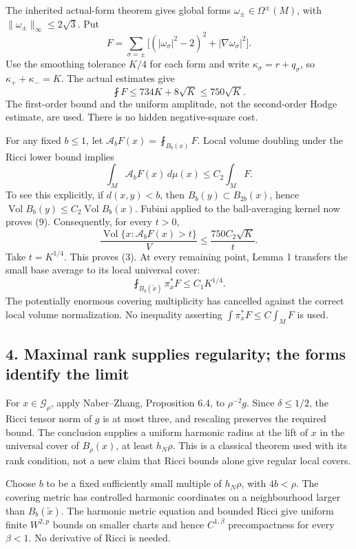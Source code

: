 \documentclass[
  11pt,
]{article}
\begin{document}
The inherited actual-form theorem gives global forms
\(\omega_\pm\in\Omega^\pm(M)\), with
\(\|\omega_\pm\|_\infty\le2\sqrt3\). Put \[
 F=\sum_{\sigma=\pm}
     \bigl[(|\omega_\sigma|^2-2)^2+|\nabla\omega_\sigma|^2\bigr].
 \tag{7}
\] Use the smoothing tolerance \(K/4\) for each form and write
\(\kappa_\sigma=r+q_\sigma\), so \(\kappa_++\kappa_-=K\). The actual
estimates give \[
 \fint F\le734K+8\sqrt K\le750\sqrt K.
 \tag{8}
\] The first-order bound and the uniform amplitude, not the second-order
Hodge estimate, are used. There is no hidden negative-square cost.

For any fixed \(b\le1\), let \(\mathcal A_bF(x)=\fint_{B_b(x)}F\). Local
volume doubling under the Ricci lower bound implies \[
 \int_M\mathcal A_bF(x)\,d\mu(x)\le C_2\int_MF.
 \tag{9}
\] To see this explicitly, if \(d(x,y)<b\), then
\(B_b(y)\subset B_{2b}(x)\), hence
\(\operatorname{Vol}B_b(y)\le C_2\operatorname{Vol}B_b(x)\). Fubini
applied to the ball-averaging kernel now proves (9). Consequently, for
every \(t>0\), \[
 \frac{\operatorname{Vol}\{x:\mathcal A_bF(x)>t\}}{V}
              \le\frac{750C_2\sqrt K}{t}.              \tag{10}
\] Take \(t=K^{1/4}\). This proves (3). At every remaining point, Lemma
1 transfers the small base average to its local universal cover: \[
               \fint_{B_b(\widetilde x)}\pi_x^*F
                         \le C_1K^{1/4}.               \tag{11}
\] The potentially enormous covering multiplicity has cancelled against
the correct local volume normalization. No inequality asserting
\(\int\pi_x^*F\le C\int_MF\) is used.

\hypertarget{maximal-rank-supplies-regularity-the-forms-identify-the-limit}{%
\subsection{4. Maximal rank supplies regularity; the forms identify the
limit}\label{maximal-rank-supplies-regularity-the-forms-identify-the-limit}}

For \(x\in\mathcal G_\rho\), apply Naber--Zhang, Proposition 6.4, to
\(\rho^{-2}g\). Since \(\delta\le1/2\), the Ricci tensor norm of \(g\)
is at most three, and rescaling preserves the required bound. The
conclusion supplies a uniform harmonic radius at the lift of \(x\) in
the universal cover of \(B_\rho(x)\), at least \(h_N\rho\). This is a
classical theorem used with its rank condition, not a new claim that
Ricci bounds alone give regular local covers.

Choose \(b\) to be a fixed sufficiently small multiple of \(h_N\rho\),
with \(4b<\rho\). The covering metric has controlled harmonic
coordinates on a neighbourhood larger than \(B_b(\widetilde x)\). The
harmonic metric equation and bounded Ricci give uniform finite
\(W^{2,p}\) bounds on smaller charts and hence \(C^{1,\beta}\)
precompactness for every \(\beta<1\). No derivative of Ricci is needed.
\end{document}
